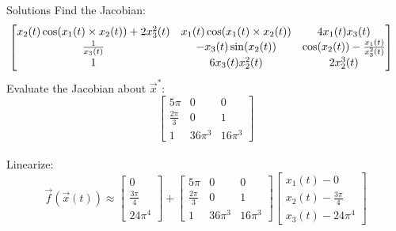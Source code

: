 \begin{frame}{Solutions}
Find the Jacobian: 
\small
\[
    \hspace{-2ex}\begin{bmatrix}
x_2(t)\cos(x_1(t)\times x_2(t)) + 2x_3^2(t)& x_1(t)\cos(x_1(t)\times x_2(t)) & 4x_1(t)x_3(t)\\ 
\frac{1}{x_3(t)}& -x_3(t)\sin(x_2(t)) &\cos(x_2(t)) - \frac{x_1(t)}{x_3^2(t)}  \\ 
1 & 6x_3(t)x_2^2(t)& 2 x_2^3(t) 
\end{bmatrix}
\]
\normalsize
Evaluate the Jacobian about $\vec{x}^*$:
\[
\begin{bmatrix}
5 \pi & 0 & 0\\
\frac{2 \pi }{3}& 0 & 1\\
1 & 36 \pi^3 & 16 \pi^3
\end{bmatrix}
\]
\\
Linearize:
\begin{equation*}
\vec{f}(\vec{x}(t)) \approx 
\begin{bmatrix}
0 \\ \frac{3\pi }{4} \\ 24 \pi^4
\end{bmatrix} +
\begin{bmatrix}
5 \pi & 0 & 0\\
\frac{2 \pi }{3}& 0 & 1\\
1 & 36 \pi^3 & 16 \pi^3
\end{bmatrix}
\begin{bmatrix}
x_1(t) - 0 \\ x_2(t) - \frac{3\pi }{4} \\ x_3(t) - 24 \pi^4
\end{bmatrix}
\end{equation*}

\end{frame}

